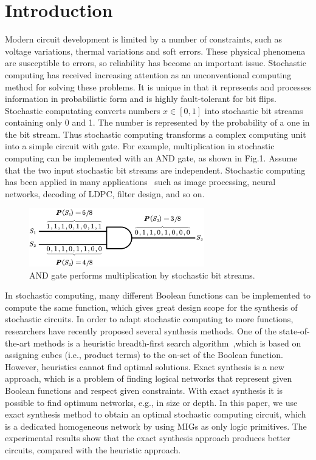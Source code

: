 \documentclass[conference,letterpaper]{IEEEtran}
\begin{document}
\section*{Introduction}
Modern circuit development is limited by a number of constraints, such as voltage variations, thermal variations and soft errors. These physical phenomena are susceptible to errors, so reliability has become an important issue. Stochastic computing has received increasing attention as an unconventional computing method for solving these problems. It is unique in that it represents and processes information in probabilistic form and is highly fault-tolerant for bit flips. Stochastic computating converts numbers $x \in[0,1]$ into stochastic bit streams containing only 0 and 1. The number is represented by the probability of a one in the bit stream. Thus stochastic computing transforms a complex computing unit into a simple  circuit with gate. For example, multiplication in stochastic computing can be implemented with an AND gate, as shown in Fig.1.  Assume
that the two input stochastic bit streams are independent. Stochastic computing has been applied in many applications~\cite{1} such as image processing, neural networks, decoding of LDPC, filter design, and so on.

\begin{figure}[htbp]
	\centering
	\includegraphics[width=3in]{fig/AND3.pdf}	
	\caption{AND gate performs multiplication by stochastic bit streams.} 
\end{figure}

In stochastic computing, many different Boolean functions can be implemented to compute the same function, which gives great design scope for the synthesis of stochastic circuits. In order to adapt stochastic computing to more functions, researchers have recently proposed several synthesis methods. One of the state-of-the-art methods is a heuristic breadth-first search algorithm~\cite{2},which is based on assigning
cubes (i.e., product terms) to the on-set of the Boolean function. However, heuristics cannot find optimal solutions. Exact synthesis is a new approach, which is a problem of finding logical networks that represent given Boolean functions and respect given constraints. With exact synthesis it is possible to find optimum networks, e.g., in size or depth. In this paper, we use exact synthesis method to obtain an optimal stochastic computing circuit, which is a dedicated homogeneous network by using MIGs as only logic primitives. The experimental results show that the exact synthesis approach produces better circuits, compared with the heuristic approach.
\end{document}
